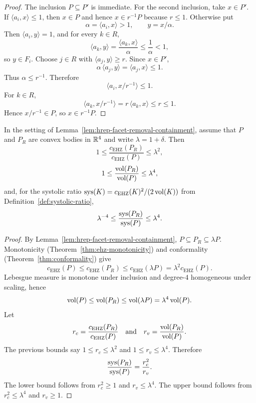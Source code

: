\begin{proof}
The inclusion $P\subseteq P'$ is immediate. For the second inclusion, take
$x\in P'$. If $\langle a_i,x\rangle\leq 1$, then $x\in P$ and hence
$x\in r^{-1}P$ because $r\leq 1$. Otherwise put
\[
  \alpha=\langle a_i,x\rangle>1,
  \qquad
  y=x/\alpha.
\]
Then $\langle a_i,y\rangle=1$, and for every $k\in R$,
\[
  \langle a_k,y\rangle
  =\frac{\langle a_k,x\rangle}{\alpha}
  \leq \frac{1}{\alpha}<1,
\]
so $y\in F_i$. Choose $j\in R$ with
$\langle a_j,y\rangle\geq r$. Since $x\in P'$,
\[
  \alpha\,\langle a_j,y\rangle
  =\langle a_j,x\rangle
  \leq 1.
\]
Thus $\alpha\leq r^{-1}$. Therefore
\[
  \langle a_i,x/r^{-1}\rangle\leq 1.
\]
For $k\in R$,
\[
  \langle a_k,x/r^{-1}\rangle
  = r\,\langle a_k,x\rangle
  \leq r\leq 1.
\]
Hence $x/r^{-1}\in P$, so $x\in r^{-1}P$.
\end{proof}

\begin{unverified}
\begin{corollary}
\label{cor:facet-removal-capacity-volume-sys-bounds}
In the setting of Lemma~\ref{lem:hrep-facet-removal-containment}, assume
that $P$ and $P_R$ are convex bodies in $\mathbb{R}^4$ and write
$\lambda=1+\delta$. Then
\[
  1
  \leq
  \frac{c_{\mathrm{EHZ}}(P_R)}{c_{\mathrm{EHZ}}(P)}
  \leq
  \lambda^2,
\]
\[
  1
  \leq
  \frac{\operatorname{vol}(P_R)}{\operatorname{vol}(P)}
  \leq
  \lambda^4,
\]
and, for the systolic ratio
$\operatorname{sys}(K)=c_{\mathrm{EHZ}}(K)^2/(2\operatorname{vol}(K))$ from
Definition~\ref{def:systolic-ratio},
\[
  \lambda^{-4}
  \leq
  \frac{\operatorname{sys}(P_R)}{\operatorname{sys}(P)}
  \leq
  \lambda^4.
\]
\end{corollary}
\end{unverified}

\begin{proof}
By Lemma~\ref{lem:hrep-facet-removal-containment},
$P\subseteq P_R\subseteq \lambda P$. Monotonicity
(Theorem~\ref{thm:ehz-monotonicity}) and conformality
(Theorem~\ref{thm:conformality}) give
\[
  c_{\mathrm{EHZ}}(P)
  \leq c_{\mathrm{EHZ}}(P_R)
  \leq c_{\mathrm{EHZ}}(\lambda P)
  = \lambda^2 c_{\mathrm{EHZ}}(P).
\]
Lebesgue measure is monotone under inclusion and degree-$4$ homogeneous under
scaling, hence
\[
  \operatorname{vol}(P)\leq \operatorname{vol}(P_R)\leq \operatorname{vol}(\lambda P)=\lambda^4\operatorname{vol}(P).
\]
Let
\[
  r_c=\frac{c_{\mathrm{EHZ}}(P_R)}{c_{\mathrm{EHZ}}(P)}
  \quad\text{and}\quad
  r_v=\frac{\operatorname{vol}(P_R)}{\operatorname{vol}(P)}.
\]
The previous bounds say $1\leq r_c\leq\lambda^2$ and
$1\leq r_v\leq\lambda^4$. Therefore
\[
  \frac{\operatorname{sys}(P_R)}{\operatorname{sys}(P)}=\frac{r_c^2}{r_v}.
\]
The lower bound follows from $r_c^2\geq 1$ and $r_v\leq\lambda^4$.
The upper bound follows from $r_c^2\leq\lambda^4$ and $r_v\geq 1$.
\end{proof}

